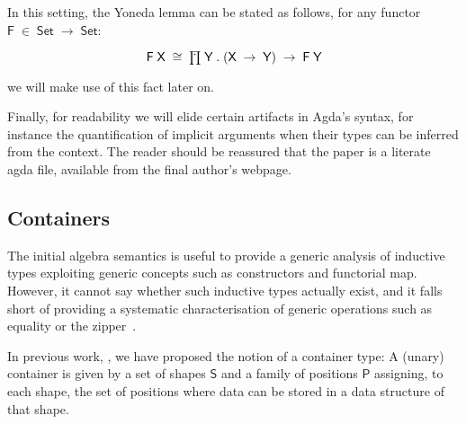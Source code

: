 \documentclass[a4paper]{article}
\makeatletter
\newcommand{\Conid}[1]{\mathit{#1}}
\newcommand{\Varid}[1]{\mathit{#1}}
\newcommand{\anonymous}{\kern0.06em \vbox{\hrule\@width.5em}}
\def\resethooks{%
  \global\let\SaveRestoreHook\empty
  \global\let\ColumnHook\empty}
\newcommand{\hsindent}[1]{\quad}%
\let\hspre\empty
\let\hspost\empty
\renewcommand\Varid[1]{\mathord{\textsf{#1}}}
\let\Conid\Varid
\newcommand\Keyword[1]{\textsf{\textbf{#1}}}
\makeatother
\begin{document}
In this setting, the Yoneda lemma can be stated as follows, for any functor \ensuremath{\Conid{F}\;\in\;\Conid{Set}\;\rightarrow\;\Conid{Set}}:

\[\mbox{\ensuremath{\Conid{F}\;\Conid{X}\;\cong\;\prodd\;\Conid{Y}\;.\;(\Conid{X}\;\rightarrow\;\Conid{Y})\;\rightarrow\;\Conid{F}\;\Conid{Y}}}\]

we will make use of this fact later on.

Finally, for readability we will elide certain artifacts in Agda's syntax,
for instance the quantification of implicit arguments when their types can be
inferred from the context. The reader should be reassured that the paper is a
literate agda file, available from the final author's webpage.
 
\subsection{Containers}


The initial algebra semantics is useful to provide a generic
analysis of inductive types exploiting generic concepts such as
constructors and functorial map. However, it cannot say whether such inductive
types actually exist, and it falls short of providing a systematic
characterisation of generic operations such as equality or the
zipper~\cite{huet:zipper,conor:derivative}. 

In previous
work, \cite{alti:cont-tcs,alti:fossacs03}, we have proposed the notion of a container
type: A (unary) container is given by a set of shapes \ensuremath{\Conid{S}} and a
family of positions \ensuremath{\Conid{P}} assigning, to each shape, the set
of positions where data can be stored in a data structure of that
shape.

\resethooks
\end{document}
